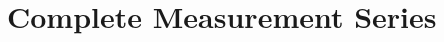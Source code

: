 \chapter{Complete Measurement Series}\label{app:measurements}
\newif\ifPlatzhalterAlsTabelle%
\PlatzhalterAlsTabelletrue%
\newcommand{\PlatzhalterTabRef}[1]{\ifPlatzhalterAlsTabelle\else{} (Table~\ref{#1})\fi}


